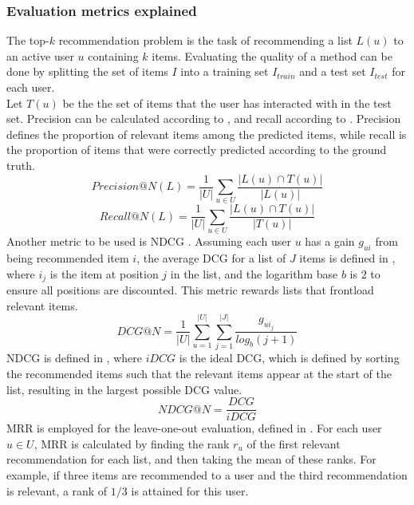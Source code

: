\subsubsection*{Evaluation metrics explained}
The top-$k$ recommendation problem is the task of recommending a list $L(u)$ to an active user $u$ containing $k$ items.
Evaluating the quality of a method can be done by splitting the set of items $I$ into a training set $I_{train}$ and a test set $I_{test}$ for each user.
\\
Let $T(u)$ be the the set of items that the user has interacted with in the test set.
Precision can be calculated according to , and recall according to .
Precision defines the proportion of relevant items among the predicted items, while recall is the proportion of items that were correctly predicted according to the ground truth.
\begin{equation}
    \label{eqn:precision}
    Precision@N(L) = \frac{1}{|U|} \sum\limits_{u \in U}\frac{|L(u) \cap T(u)|}{|L(u)|}
\end{equation}
\begin{equation}
    \label{eqn:recall}
    Recall@N(L) = \frac{1}{|U|} \sum\limits_{u \in U} \frac{|L(u) \cap T(u)|}{|T(u)|}
\end{equation}
Another metric to be used is NDCG \cite{dcgpaper}.
Assuming each user $u$ has a gain $g_{ui}$ from being recommended item $i$, the average DCG for a list of $J$ items is defined in , where $i_j$ is the item at position $j$ in the list, and the logarithm base $b$ is $2$ to ensure all positions are discounted.
This metric rewards lists that frontload relevant items.
\begin{equation}
    \label{eqn:dcg}
    DCG@N = \frac{1}{|U|} \sum\limits_{u=1}^{|U|} \sum\limits_{j = 1}^{|J|} \frac{g_{ui_j}}{log_b (j+1)}
\end{equation}
NDCG is defined in , where $iDCG$ is the ideal DCG, which is defined by sorting the recommended items such that the relevant items appear at the start of the list, resulting in the largest possible DCG value.
\begin{equation}
    \label{eqn:ndcg}
    NDCG@N = \frac{DCG}{iDCG}
\end{equation}
MRR \cite{MRR} is employed for the leave-one-out evaluation, defined in .
For each user $u \in U$, MRR is calculated by finding the rank $r_u$ of the first relevant recommendation for each list, and then taking the mean of these ranks.
For example, if three items are recommended to a user and the third recommendation is relevant, a rank of $1/3$ is attained for this user.
